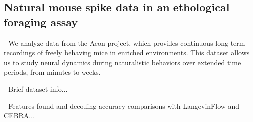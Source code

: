 \subsection{Natural mouse spike data in an ethological foraging assay}

- We analyze data from the Aeon project, which provides continuous long-term recordings of freely behaving mice in enriched environments. This dataset allows us to study neural dynamics during naturalistic behaviors over extended time periods, from minutes to weeks.

- Brief dataset info...

- Features found and decoding accuracy comparisons with LangevinFlow and CEBRA...

